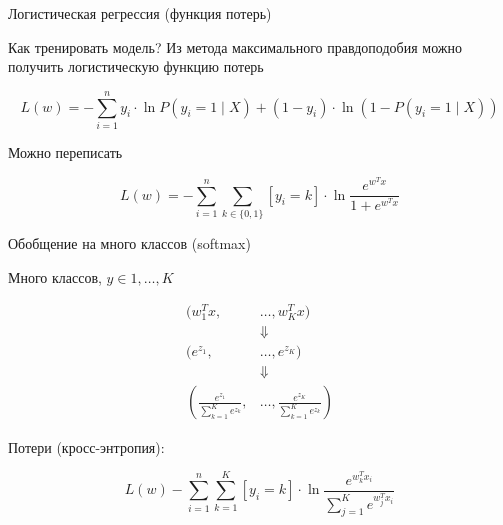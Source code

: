 \documentclass[notes,12pt, aspectratio=169]{beamer}
\begin{document}
\begin{frame}{Логистическая регрессия (функция потерь)}

Как тренировать модель? Из метода максимального правдоподобия можно получить логистическую функцию потерь  

\[
L(w) = - \sum_{i=1}^n y_i \cdot \ln P(y_i = 1 \mid X) + (1 - y_i) \cdot \ln (1 - P(y_i = 1\mid X))
\]

Можно переписать

\[
L(w)  = - \sum_{i=1}^n \sum_{k \in \{0,1\}} [y_i = k] \cdot \ln \frac{e^{w^Tx}}{1 + e^{w^Tx}}
\]

\end{frame}


{
	\begin{frame}
\end{frame}
}



\begin{frame}{Обобщение на много классов (softmax)}
	
Много классов, $y \in {1, \ldots, K}$
	
\begin{equation*}
\begin{aligned}
(w_1^T x, &\ldots, w_K^Tx) \\
&\Downarrow \\
(e^{z_1}, &\ldots, e^{z_K}) \\
&\Downarrow \\
\left(\frac{e^{z_1}}{\sum_{k=1}^K e^{z_k}}\right., &\ldots,\left. \frac{e^{z_K}}{\sum_{k=1}^K e^{z_k}}  \right)
\end{aligned}
\end{equation*}

Потери (кросс-энтропия): 

\[
L(w) - \sum_{i=1}^n \sum_{k=1}^K [y_i = k] \cdot \ln \frac{e^{w_k^Tx_i}}{\sum_{j=1}^{K} e^{w_j^Tx_i}}
\]
\end{frame}
\end{document}
